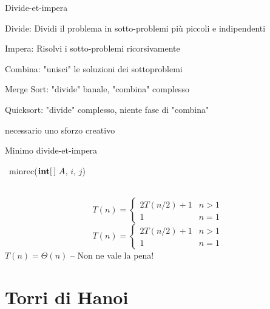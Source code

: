 \begin{frame}{Divide-et-impera}
    
\vspace{-9pt}
\BIL
\item \alert{Divide}: Dividi il problema in sotto-problemi più piccoli e indipendenti
\item \alert{Impera}: Risolvi i sotto-problemi ricorsivamente
\item \alert{Combina}: "unisci" le soluzioni dei sottoproblemi
\EIL

\medskip
{}
\BIL
\item Merge Sort: "divide" banale, "combina" complesso
\item Quicksort: "divide" complesso, niente fase di "combina"
\item \EE necessario uno sforzo creativo
\EIL

\end{frame}

\begin{frame}{Minimo divide-et-impera}
	
\vspace{-9pt}
\begin{Procedure}
\caption[A]{\INTEGER\ \textsf{minrec}($\INTEGER[\,]\ A$, \INTEGER $i$, \INTEGER $j$)}
\end{Procedure}

\vspace{-12pt}
\begin{myboxtitle}[Complessità]
\begin{overprint}
~
\[
  T(n) = \begin{cases} 
		2T(n/2) + 1 & n>1 \\
		1 & n=1
	\end{cases}
\]
\[
  T(n) = \begin{cases} 
		2T(n/2) + 1 & n>1 \\
		1 & n=1
	\end{cases}
\]
$T(n) = \Theta(n)$ -- Non ne vale la pena!
\end{overprint}
\end{myboxtitle}

\end{frame}


\section{Torri di Hanoi}

